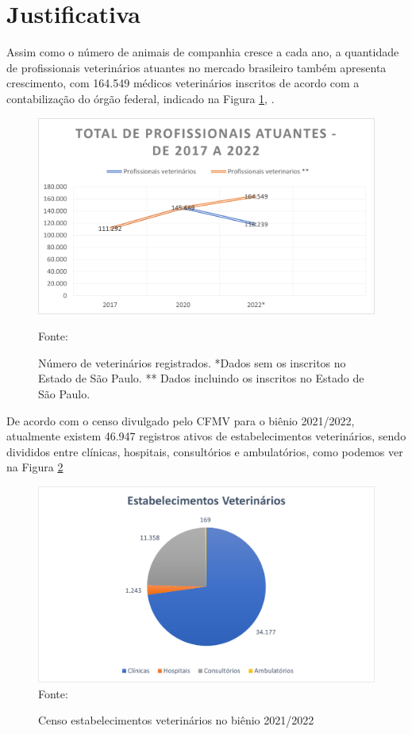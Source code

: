 \documentclass[
    12pt,               %
    openright,          %
    oneside,
    a4paper,            %
    BIBLATEX,           %
    TODO,               %
    english,            %
    brazil              %
    ]{ifsp-spo-inf-ctds}
\begin{document}
    \section{Justificativa}\label{justificativa}

    Assim como o número de animais de companhia cresce a cada ano, a quantidade de profissionais veterinários atuantes no mercado brasileiro também apresenta crescimento, com 164.549 médicos veterinários inscritos de acordo com a contabilização do órgão federal, indicado na Figura \ref{fig:grafico vet}, .
    
    \begin{figure}[H]
        \centering
        \includegraphics{images/grafico_profissionais.png}
        \caption{Número de veterinários registrados. *Dados sem os inscritos no Estado de São Paulo. ** Dados incluindo os inscritos no Estado de São Paulo.}
        \footnotesize {Fonte:  }
        \label{fig:grafico vet}
    \end{figure}
    
    De acordo com o censo divulgado pelo CFMV para o biênio 2021/2022, atualmente existem 46.947 registros ativos de estabelecimentos veterinários, sendo divididos entre clínicas, hospitais, consultórios e ambulatórios, como podemos ver na Figura \ref{fig:grafico clinicas} 
    
    \begin{figure}[H]
        \centering
        \caption{Censo estabelecimentos veterinários no biênio 2021/2022}
        \includegraphics{images/grafico_estabelecimento.png}
        \footnotesize{ Fonte: }
        \label{fig:grafico clinicas}
    \end{figure}
    
\end{document}

